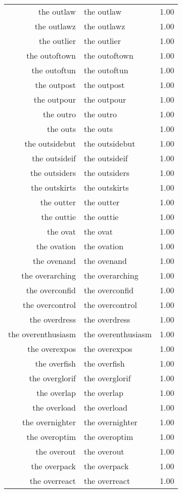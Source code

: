 \begin{table}[ht]
\begin{tabular}{rlr}
  the outlaw & the outlaw & 1.00 \\ 
  the outlawz & the outlawz & 1.00 \\ 
  the outlier & the outlier & 1.00 \\ 
  the outoftown & the outoftown & 1.00 \\ 
  the outoftun & the outoftun & 1.00 \\ 
  the outpost & the outpost & 1.00 \\ 
  the outpour & the outpour & 1.00 \\ 
  the outro & the outro & 1.00 \\ 
  the outs & the outs & 1.00 \\ 
  the outsidebut & the outsidebut & 1.00 \\ 
  the outsideif & the outsideif & 1.00 \\ 
  the outsiders & the outsiders & 1.00 \\ 
  the outskirts & the outskirts & 1.00 \\ 
  the outter & the outter & 1.00 \\ 
  the outtie & the outtie & 1.00 \\ 
  the ovat & the ovat & 1.00 \\ 
  the ovation & the ovation & 1.00 \\ 
  the ovenand & the ovenand & 1.00 \\ 
  the overarching & the overarching & 1.00 \\ 
  the overconfid & the overconfid & 1.00 \\ 
  the overcontrol & the overcontrol & 1.00 \\ 
  the overdress & the overdress & 1.00 \\ 
  the overenthusiasm & the overenthusiasm & 1.00 \\ 
  the overexpos & the overexpos & 1.00 \\ 
  the overfish & the overfish & 1.00 \\ 
  the overglorif & the overglorif & 1.00 \\ 
  the overlap & the overlap & 1.00 \\ 
  the overload & the overload & 1.00 \\ 
  the overnighter & the overnighter & 1.00 \\ 
  the overoptim & the overoptim & 1.00 \\ 
  the overout & the overout & 1.00 \\ 
  the overpack & the overpack & 1.00 \\ 
  the overreact & the overreact & 1.00 \\ 

\end{tabular}
\end{table}
